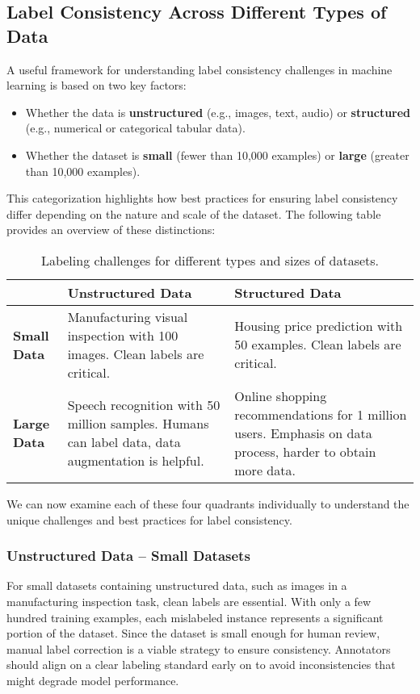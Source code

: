 \documentclass[12pt,openany]{book}
\begin{document}
\subsection{Label Consistency Across Different Types of Data}

A useful framework for understanding label consistency challenges in machine learning is based on two key factors:
\begin{itemize}
    \item Whether the data is \textbf{unstructured} (e.g., images, text, audio) or \textbf{structured} (e.g., numerical or categorical tabular data).
    \item Whether the dataset is \textbf{small} (fewer than 10,000 examples) or \textbf{large} (greater than 10,000 examples).
\end{itemize}

This categorization highlights how best practices for ensuring label consistency differ depending on the nature and scale of the dataset. The following table provides an overview of these distinctions:

\begin{table}[H]
    \centering
    \renewcommand{\arraystretch}{1.5}
    \begin{tabular}{|p{3.5cm}|p{5.5cm}|p{5.5cm}|}
        \hline
        \textbf{} & \textbf{Unstructured Data} & \textbf{Structured Data} \\
        \hline
        \textbf{Small Data} & Manufacturing visual inspection with 100 images. Clean labels are critical.  & Housing price prediction with 50 examples. Clean labels are critical. \\
        \hline
        \textbf{Large Data} & Speech recognition with 50 million samples. Humans can label data, data augmentation is helpful. & Online shopping recommendations for 1 million users. Emphasis on data process, harder to obtain more data. \\
        \hline
    \end{tabular}
    \caption{Labeling challenges for different types and sizes of datasets.}
    \label{tab:label_consistency_framework}
\end{table}

We can now examine each of these four quadrants individually to understand the unique challenges and best practices for label consistency.

\subsubsection{Unstructured Data – Small Datasets}
For small datasets containing unstructured data, such as images in a manufacturing inspection task, clean labels are essential. With only a few hundred training examples, each mislabeled instance represents a significant portion of the dataset. Since the dataset is small enough for human review, manual label correction is a viable strategy to ensure consistency. Annotators should align on a clear labeling standard early on to avoid inconsistencies that might degrade model performance.
\end{document}
